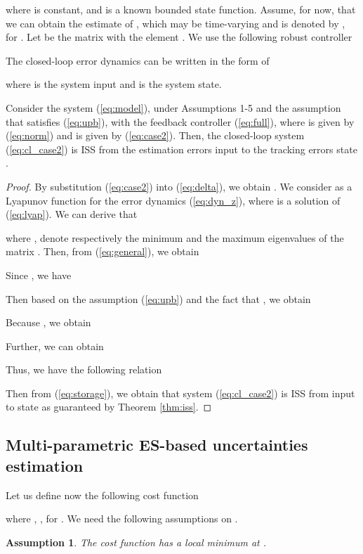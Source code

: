 \documentclass[twoside,leqno,onecolumn]{article}
\newtheorem{assumption}{Assumption}
\begin{document}
where  is constant, and 
is a known bounded state function. Assume, for now, that we can
obtain the estimate of , which may be time-varying
and is denoted by , for . Let 
be the matrix with the element .
We use the following robust controller

The closed-loop error dynamics can be written in the form of

where  is the system input and  is the system state.



\begin{theorem}
\label{thm:case2}
Consider the system (\ref{eq:model}), under Assumptions 1-5 and
the assumption that  satisfies (\ref{eq:upb}),
with the feedback controller (\ref{eq:full}), where  is given
by (\ref{eq:norm}) and  is given by (\ref{eq:case2}). Then,
the closed-loop system (\ref{eq:cl_case2}) is ISS from the
estimation errors input  to
the tracking errors state .
\end{theorem}

\begin{proof}
By substitution (\ref{eq:case2}) into (\ref{eq:delta}), we obtain
. We consider  as a Lyapunov
function for the error dynamics (\ref{eq:dyn_z}), where  is a
solution of (\ref{eq:lyap}). We can derive that

where ,   denote
respectively the minimum and the maximum eigenvalues of the matrix
. Then, from (\ref{eq:general}), we obtain

Since , we have

Then based on the assumption (\ref{eq:upb}) and the fact that , we obtain

Because , we obtain

Further, we can obtain

Thus, we have the following relation

Then from (\ref{eq:storage}), we obtain that system (\ref{eq:cl_case2}) is ISS from input  to state  as guaranteed by Theorem \ref{thm:iss}.
\end{proof}




\subsection{Multi-parametric ES-based uncertainties estimation}
\label{sec:ES}
Let us define now the following cost function

where , ,  for . We need the following assumptions on .

\begin{assumption}
\label{asp:cost}
The cost function  has a local minimum at .
\end{assumption}
\end{document}
